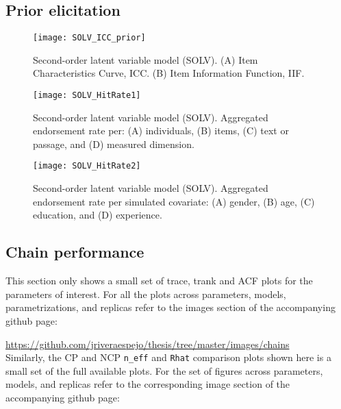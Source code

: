 \subsection{Prior elicitation}
%
\begin{figure}[H]
	\centering
	\texttt{[image: SOLV\_ICC\_prior]}
	\caption[Second-order latent variable model (SOLV). Item Characteristic Curve (ICC) and Item Information Function (IIF).]%
	{Second-order latent variable model (SOLV). (A) Item Characteristics Curve, ICC. (B) Item Information Function, IIF.}
	\label{fig:SOLV_ICC_prior}
\end{figure}
%
\begin{figure}[H]
	\centering
	\texttt{[image: SOLV\_HitRate1]}
	\caption[Second-order latent variable model (SOLV). Hit rate per dimensions of interest.]%
	{Second-order latent variable model (SOLV). Aggregated endorsement rate per: (A) individuals, (B) items, (C) text or passage, and (D) measured dimension.}
	\label{fig:SOLV_hitrate1}
\end{figure}
%
\begin{figure}[H]
	\centering
	\texttt{[image: SOLV\_HitRate2]}
	\caption[Second-order latent variable model (SOLV). Hit rate per simulated covariate.]%
	{Second-order latent variable model (SOLV). Aggregated endorsement rate per simulated covariate: (A) gender, (B) age, (C) education, and (D) experience.}
	\label{fig:SOLV_hitrate2}
\end{figure}


\subsection{Chain performance} \label{sub_sect:chain_performance}

This section only shows a small set of trace, trank and ACF plots for the parameters of interest. For all the plots across parameters, models, parametrizations, and replicas refer to the images section of the accompanying github page:

\noindent \url{https://github.com/jriveraespejo/thesis/tree/master/images/chains} \\

\noindent Similarly, the CP and NCP \texttt{n\_eff} and \texttt{Rhat} comparison plots shown here is a small set of the full available plots. For the set of figures across parameters, models, and replicas refer to the corresponding image section of the accompanying github page:

